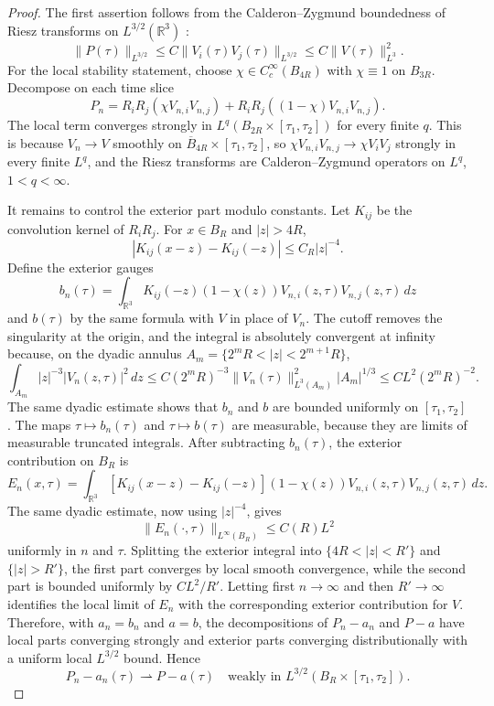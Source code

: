 \documentclass[11pt]{amsart}
\theoremstyle{plain}
\theoremstyle{definition}
\theoremstyle{remark}
\numberwithin{equation}{section}
\newcommand{\R}{\mathbb R}
\begin{document}
\begin{proof}
The first assertion follows from the Calderon--Zygmund boundedness of Riesz
transforms on \(L^{3/2}(\R^3)\) \cite{Stein1970}:
\[
   \|P(\tau)\|_{L^{3/2}}
   \le C\|V_i(\tau)V_j(\tau)\|_{L^{3/2}}
   \le C\|V(\tau)\|_{L^3}^2 .
\]
For the local stability statement, choose
\(\chi\in C_c^\infty(B_{4R})\) with \(\chi\equiv1\) on \(B_{3R}\).  Decompose
on each time slice
\[
   P_n=R_iR_j(\chi V_{n,i}V_{n,j})
       +R_iR_j((1-\chi)V_{n,i}V_{n,j}) .
\]
The local term converges strongly in \(L^q(B_{2R}\times[\tau_1,\tau_2])\) for
every finite \(q\).  This is because \(V_n\to V\) smoothly on
\(\overline B_{4R}\times[\tau_1,\tau_2]\), so
\(\chi V_{n,i}V_{n,j}\to\chi V_iV_j\) strongly in every finite \(L^q\), and
the Riesz transforms are Calderon--Zygmund operators on \(L^q\), \(1<q<\infty\).

It remains to control the exterior part modulo constants.  Let \(K_{ij}\) be
the convolution kernel of \(R_iR_j\).  For \(x\in B_R\) and
\(|z|>4R\),
\[
   |K_{ij}(x-z)-K_{ij}(-z)|\le C_R |z|^{-4}.
\]
Define the exterior gauges
\[
   b_n(\tau)
   =
   \int_{\R^3} K_{ij}(-z)(1-\chi(z))V_{n,i}(z,\tau)V_{n,j}(z,\tau)\,dz
\]
and \(b(\tau)\) by the same formula with \(V\) in place of \(V_n\).
The cutoff removes the singularity at the origin, and the integral is
absolutely convergent at infinity because, on the dyadic annulus
\(A_m=\{2^mR<|z|<2^{m+1}R\}\),
\[
   \int_{A_m}|z|^{-3}|V_n(z,\tau)|^2\,dz
   \le
   C(2^mR)^{-3}
   \|V_n(\tau)\|_{L^3(A_m)}^2|A_m|^{1/3}
   \le C L^2(2^mR)^{-2}.
\]
The same dyadic estimate shows that \(b_n\) and \(b\) are bounded uniformly on
\([\tau_1,\tau_2]\).  The maps \(\tau\mapsto b_n(\tau)\) and
\(\tau\mapsto b(\tau)\) are measurable, because they are limits of measurable
truncated integrals.
After subtracting \(b_n(\tau)\), the exterior contribution on \(B_R\) is
\[
   E_n(x,\tau)
   =
   \int_{\R^3}
   [K_{ij}(x-z)-K_{ij}(-z)]
   (1-\chi(z))V_{n,i}(z,\tau)V_{n,j}(z,\tau)\,dz .
\]
The same dyadic estimate, now using \(|z|^{-4}\), gives
\[
   \|E_n(\cdot,\tau)\|_{L^\infty(B_R)}
   \le C(R)L^2
\]
uniformly in \(n\) and \(\tau\).  Splitting the exterior integral into
\(\{4R<|z|<R'\}\) and \(\{|z|>R'\}\), the first part converges by local smooth
convergence, while the second part is bounded uniformly by \(C L^2/R'\).  Letting
first \(n\to\infty\) and then \(R'\to\infty\) identifies the local limit of
\(E_n\) with the corresponding exterior contribution for \(V\).  Therefore,
with \(a_n=b_n\) and \(a=b\), the decompositions of \(P_n-a_n\) and \(P-a\)
have local parts converging strongly and exterior parts converging
distributionally with a uniform local \(L^{3/2}\) bound.  Hence
\[
   P_n-a_n(\tau)\rightharpoonup P-a(\tau)
   \quad\text{weakly in }L^{3/2}(B_R\times[\tau_1,\tau_2]).
\]
\end{proof}
\end{document}

